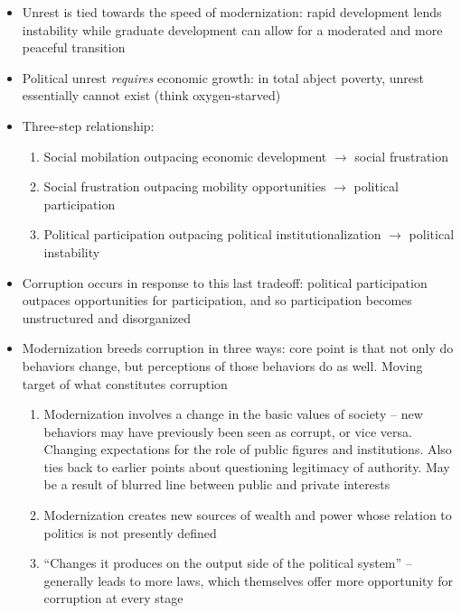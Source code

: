 \documentclass[12pt]{article}
\begin{document}
\begin{itemize}[leftmargin=*, itemsep=4pt]
\begin{enumerate}
        \item ``Political modernization involves increased participation in politics by social groups throughout society.'' Political participation broadens
    \end{enumerate}
    \item Unrest is tied towards the speed of modernization: rapid development lends instability while graduate development can allow for a moderated and more peaceful transition
    \item Political unrest \emph{requires} economic growth: in total abject poverty, unrest essentially cannot exist (think oxygen-starved)
    \item Three-step relationship:
    \begin{enumerate}
        \item Social mobilation outpacing economic development $\rightarrow$ social frustration
        \item Social frustration outpacing mobility opportunities $\rightarrow$ political participation
        \item Political participation outpacing political institutionalization $\rightarrow$ political instability
    \end{enumerate}
    \item Corruption occurs in response to this last tradeoff: political participation outpaces opportunities for participation, and so participation becomes unstructured and disorganized
    \item Modernization breeds corruption in three ways: core point is that not only do behaviors change, but perceptions of those behaviors do as well. Moving target of what constitutes corruption
    \begin{enumerate}
        \item Modernization involves a change in the basic values of society -- new behaviors may have previously been seen as corrupt, or vice versa. Changing expectations for the role of public figures and institutions. Also ties back to earlier points about questioning legitimacy of authority. May be a result of blurred line between public and private interests
        \item Modernization creates new sources of wealth and power whose relation to politics is not presently defined
        \item ``Changes it produces on the output side of the political system'' -- generally leads to more laws, which themselves offer more opportunity for corruption at every stage

\end{enumerate}
\end{itemize}
\end{document}

